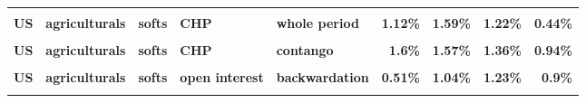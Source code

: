 \documentclass[
  authoryear,
  preprint,
  3p]{elsarticle}
\begin{document}
\begin{landscape}
\begin{longtable}[t]{>{}l>{}l>{}l>{}l>{}l>{}r>{}r>{}r>{}r}
\textbf{\cellcolor{gray!10}{US}} & \textbf{\cellcolor{gray!10}{agriculturals}} & \textbf{\cellcolor{gray!10}{softs}} & \textbf{\cellcolor{gray!10}{market}} & \textbf{\cellcolor{gray!10}{contango}} & \textcolor[HTML]{4285f4}{\textbf{\cellcolor{gray!10}{3.87\%}}} & \textcolor[HTML]{4285f4}{\textbf{\cellcolor{gray!10}{9.02\%}}} & \textcolor[HTML]{4285f4}{\textbf{\cellcolor{gray!10}{21.64\%}}} & \textcolor[HTML]{4285f4}{\textbf{\cellcolor{gray!10}{8.6\%}}}\\
\textbf{US} & \textbf{agriculturals} & \textbf{softs} & \textbf{CHP} & \textbf{whole period} & \textcolor[HTML]{4285f4}{\textbf{1.12\%}} & \textcolor[HTML]{4285f4}{\textbf{1.59\%}} & \textcolor[HTML]{4285f4}{\textbf{1.22\%}} & \textcolor[HTML]{4285f4}{\textbf{0.44\%}}\\
\textbf{\cellcolor{gray!10}{US}} & \textbf{\cellcolor{gray!10}{agriculturals}} & \textbf{\cellcolor{gray!10}{softs}} & \textbf{\cellcolor{gray!10}{CHP}} & \textbf{\cellcolor{gray!10}{backwardation}} & \textcolor[HTML]{4285f4}{\textbf{\cellcolor{gray!10}{1.11\%}}} & \textcolor[HTML]{4285f4}{\textbf{\cellcolor{gray!10}{2.07\%}}} & \textcolor[HTML]{4285f4}{\textbf{\cellcolor{gray!10}{1.49\%}}} & \textcolor[HTML]{4285f4}{\textbf{\cellcolor{gray!10}{1.35\%}}}\\
\addlinespace
\textbf{US} & \textbf{agriculturals} & \textbf{softs} & \textbf{CHP} & \textbf{contango} & \textcolor[HTML]{4285f4}{\textbf{1.6\%}} & \textcolor[HTML]{4285f4}{\textbf{1.57\%}} & \textcolor[HTML]{4285f4}{\textbf{1.36\%}} & \textcolor[HTML]{4285f4}{\textbf{0.94\%}}\\
\textbf{\cellcolor{gray!10}{US}} & \textbf{\cellcolor{gray!10}{agriculturals}} & \textbf{\cellcolor{gray!10}{softs}} & \textbf{\cellcolor{gray!10}{open interest}} & \textbf{\cellcolor{gray!10}{whole period}} & \textcolor[HTML]{4285f4}{\textbf{\cellcolor{gray!10}{0.29\%}}} & \textcolor[HTML]{4285f4}{\textbf{\cellcolor{gray!10}{0.28\%}}} & \textcolor[HTML]{4285f4}{\textbf{\cellcolor{gray!10}{0.36\%}}} & \textcolor[HTML]{4285f4}{\textbf{\cellcolor{gray!10}{0.28\%}}}\\
\textbf{US} & \textbf{agriculturals} & \textbf{softs} & \textbf{open interest} & \textbf{backwardation} & \textcolor[HTML]{4285f4}{\textbf{0.51\%}} & \textcolor[HTML]{4285f4}{\textbf{1.04\%}} & \textcolor[HTML]{4285f4}{\textbf{1.23\%}} & \textcolor[HTML]{4285f4}{\textbf{0.9\%}}\\
\textbf{\cellcolor{gray!10}{US}} & \textbf{\cellcolor{gray!10}{agriculturals}} & \textbf{\cellcolor{gray!10}{softs}} & \textbf{\cellcolor{gray!10}{open interest}} & \textbf{\cellcolor{gray!10}{contango}} & \textcolor[HTML]{4285f4}{\textbf{\cellcolor{gray!10}{0.4\%}}} & \textcolor[HTML]{4285f4}{\textbf{\cellcolor{gray!10}{0.35\%}}} & \textcolor[HTML]{4285f4}{\textbf{\cellcolor{gray!10}{0.66\%}}} & \textcolor[HTML]{4285f4}{\textbf{\cellcolor{gray!10}{0.3\%}}}\\

\end{longtable}
\end{landscape}
\end{document}
